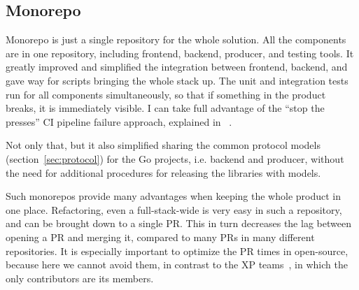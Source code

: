 \subsection{Monorepo}\label{sec:monorepo}

Monorepo is just a single repository
for the whole solution.
All the components are in one repository,
including frontend,
backend,
producer, and
testing tools.
It greatly improved and simplified
the integration between frontend, backend,
and gave way for scripts
bringing the whole stack up.
The unit and integration tests run for all
components simultaneously,
so that if something in the product breaks,
it is immediately visible.
I can take full advantage of the
``stop the presses'' \ac{CI} pipeline failure approach,
explained in ~\cite{martin_clean_2011}.

Not only that,
but it also simplified sharing
the common protocol models (section~\ref{sec:protocol})
for the Go projects, i.e. backend and producer,
without the need for additional procedures
for releasing the libraries with models.

Such monorepos provide many advantages
when keeping the whole product in one place.
Refactoring,
even a full-stack-wide
is very easy in such a repository,
and can be brought down to a single \ac{PR}.
This in turn decreases the lag between
opening a \ac{PR} and merging it,
compared to many \acp{PR} in many different repositories.
It is especially important
to optimize the \ac{PR} times in open-source,
because here we cannot avoid them,
in contrast to the \ac{XP} teams~\cite{beck_extreme_2004},
in which the only contributors are its members.
